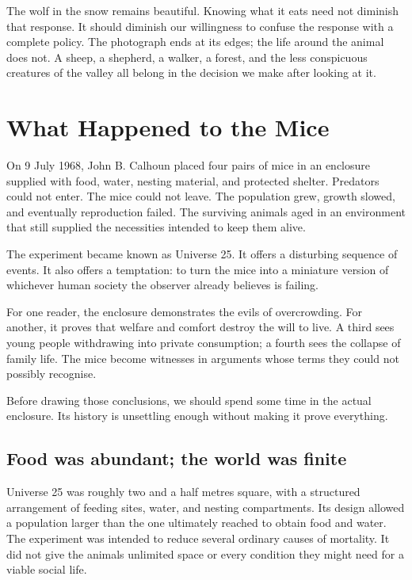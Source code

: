 \documentclass[12pt,a4paper]{book}
\begin{document}
The wolf in the snow remains beautiful. Knowing what it eats need not diminish that response. It should diminish our willingness to confuse the response with a complete policy. The photograph ends at its edges; the life around the animal does not. A sheep, a shepherd, a walker, a forest, and the less conspicuous creatures of the valley all belong in the decision we make after looking at it.

\chapter{What Happened to the Mice}

On 9 July 1968, John B. Calhoun placed four pairs of mice in an enclosure supplied with food, water, nesting material, and protected shelter. Predators could not enter. The mice could not leave. The population grew, growth slowed, and eventually reproduction failed. The surviving animals aged in an environment that still supplied the necessities intended to keep them alive.

The experiment became known as Universe 25. It offers a disturbing sequence of events. It also offers a temptation: to turn the mice into a miniature version of whichever human society the observer already believes is failing.

For one reader, the enclosure demonstrates the evils of overcrowding. For another, it proves that welfare and comfort destroy the will to live. A third sees young people withdrawing into private consumption; a fourth sees the collapse of family life. The mice become witnesses in arguments whose terms they could not possibly recognise.

Before drawing those conclusions, we should spend some time in the actual enclosure. Its history is unsettling enough without making it prove everything.

\section*{Food was abundant; the world was finite}

Universe 25 was roughly two and a half metres square, with a structured arrangement of feeding sites, water, and nesting compartments. Its design allowed a population larger than the one ultimately reached to obtain food and water. The experiment was intended to reduce several ordinary causes of mortality. It did not give the animals unlimited space or every condition they might need for a viable social life.
\end{document}
